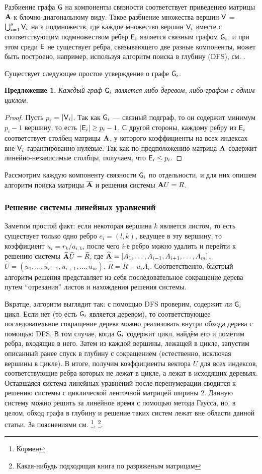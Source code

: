 \documentclass[10pt]{article}
\newtheorem{proposition}{Предложение}
\begin{document}
Разбиение графа $\mathsf{G}$ на компоненты связности соответствует приведению матрицы $\mathbf{A}$ к блочно-диагональному виду. Такое разбиение множества вершин $\mathsf{V}$ = $\bigcup_{i=1}^{s} \mathsf{V}_i$ на $s$ подмножеств, где каждое множество вершин $\mathsf{V}_i$ вместе с соответствующим подмножеством ребер $\mathsf{E}_i$ является связным графом $\mathsf{G}_i$, и при этом среди $\mathsf{E}$ не существует ребра, связывающего две разные компоненты, может быть построено, например, используя алгоритм поиска в глубину (DFS), см. \cite{cormen2009introduction}.

Существует следующее простое утверждение о графе $\mathsf{G}_i$.
\begin{proposition}
Каждый граф $\mathsf{G}_i$ является либо деревом, либо графом с одним циклом.
\end{proposition}
\begin{proof}
Пусть $p_i$ = $|\mathsf{V}_i|$. Так как $\mathsf{G}_i$ --- связный подграф, то он содержит минимум $p_i - 1$ вершину, то есть $|\mathsf{E}_i| \ge p_i - 1$. С другой стороны, каждому ребру из $\mathsf{E}_i$ соответствует столбец матрицы $\mathbf{A}$, у которого коэффициенты на всех индексах вне $\mathsf{V}_i$ гарантированно нулевые. Так как по предположению матрица $\mathbf{A}$ содержит линейно-независимые столбцы, получаем, что $\mathsf{E}_i \le p_i$.
\end{proof}

Рассмотрим каждую компоненту связности $\mathsf{G}_i$ по отдельности, и для них опишем алгоритм поиска матрицы $\overline {\mathbf{A}}$ и решения системы $\mathbf{A} U = R$.
\subsubsection{Решение системы линейных уравнений}
Заметим простой факт: если некоторая вершина $k$ является листом, то есть существует только одно ребро $e_i = (l, k)$, ведущее в эту вершину, то коэффициент $u_i = r_k / a_{i, k}$, после чего $i$-е ребро можно удалить и перейти к решению системы $\widehat {\mathbf{A}} \widehat U = \widehat R$, где $\widehat {\mathbf{A}} = [A_1, \ldots, A_{i-1}, A_{i+1}, \ldots, A_m]$, $\widehat U = (u_1, \ldots, u_{i - 1}, u_{i + 1}, \ldots, u_m)$, $\widehat R = R - u_i A_i$. Соответственно, быстрый алгоритм решения представляет из себя последовательное сокращение дерева путем ``отрезания'' листов и нахождения решения системы.

Вкратце, алгоритм выглядит так: с помощью DFS проверим, содержит ли $\mathsf{G}_i$ цикл. Если нет (то есть $\mathsf{G}_i$ является деревом), то соответствующее последовательное сокращение дерева можно реализовать внутри обхода дерева с помощью DFS. В том случае, когда $\mathsf{G}_i$ содержит цикл, найдём его и пометим ребра, входящие в него. Затем из каждой вершины, лежащей в цикле, запустим описанный ранее спуск в глубину с сокращением (естественно, исключая вершины в цикле). В итоге, получим коэффициенты вектора $U$ для всех индексов, соответствующие ребра которых не лежат в цикле, а лежат в исходящих деревьях. Оставшаяся система линейных уравнений после перенумерации сводится к решению системы с циклической ленточной матрицей ширины $2$. Данную систему можно решить за линейное время с помощью метода Гаусса, но, в целом, обход графа в глубину и решение таких систем лежат вне области данной статьи. За пояснениями см. \footnote{Кормен}, \footnote{Какая-нибудь подходящая книга по разряженым матрицам}.
\end{document}
